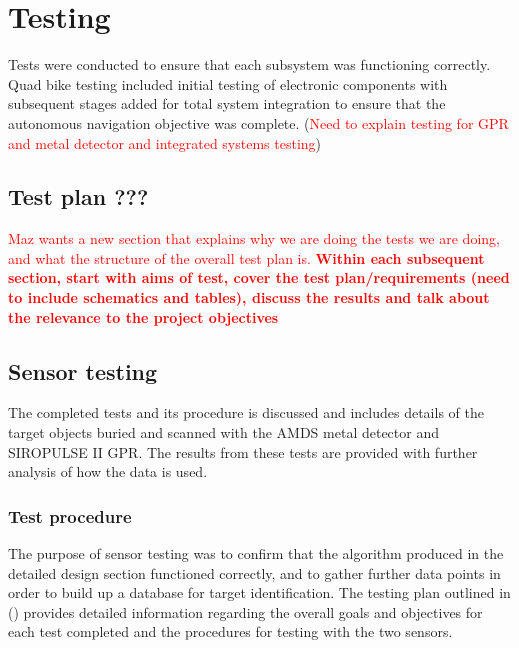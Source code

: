 \documentclass[main.tex]{subfiles}
\begin{document}
\chapter{Testing}
Tests were conducted to ensure that each subsystem was functioning correctly. Quad bike testing included initial testing of electronic components with subsequent stages added for total system integration to ensure that the autonomous navigation objective was complete.
(\textcolor{red}{Need to explain testing for GPR and metal detector and integrated systems testing})

\section{Test plan ???}
\textcolor{red}{Maz wants a new section that explains why we are doing the tests we are doing, and what the structure of the overall test plan is. \textbf{Within each subsequent section, start with aims of test, cover the test plan/requirements (need to include schematics and tables), discuss the results and talk about the relevance to the project objectives}}



\section{Sensor testing}
The completed tests and its procedure is discussed and includes details of the target objects buried and scanned with the AMDS metal detector and SIROPULSE II GPR. The results from these tests are provided with further analysis of how the data is used. 

\subsection{Test procedure}
The purpose of sensor testing was to confirm that the algorithm produced in the detailed design section functioned correctly, and to gather further data points in order to build up a database for target identification. The testing plan outlined in () provides detailed information regarding the overall goals and objectives for each test completed and the procedures for testing with the two sensors. 
\end{document}

